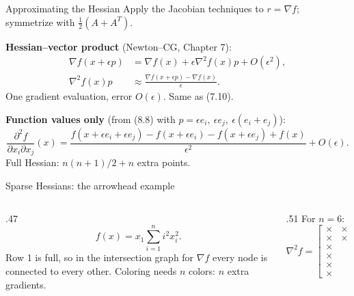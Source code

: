 \documentclass[12pt,aspectratio=169]{beamer}
\newcommand{\eps}{\epsilon}
\begin{document}
\begin{frame}{Approximating the Hessian}
  Apply the Jacobian techniques to $r=\nabla f$; symmetrize with $\tfrac12(A+A^T)$.

  \textbf{Hessian--vector product} (Newton--CG, Chapter 7):
  \begin{align}
    \nabla f(x+\eps p) &= \nabla f(x)+\eps\nabla^2 f(x)p+O(\eps^2), \tag{8.19}\\
    \nabla^2 f(x)p &\approx \frac{\nabla f(x+\eps p)-\nabla f(x)}{\eps}. \tag{8.20}
  \end{align}
  One gradient evaluation, error $O(\eps)$. Same as (7.10).

  \textbf{Function values only} (from (8.8) with $p=\eps e_i,\ \eps e_j,\ \eps(e_i+e_j)$):
  \begin{equation}
    \frac{\partial^2 f}{\partial x_i\partial x_j}(x) =
    \frac{f(x+\eps e_i+\eps e_j)-f(x+\eps e_i)-f(x+\eps e_j)+f(x)}{\eps^2}+O(\eps). \tag{8.21}
  \end{equation}
  Full Hessian: $n(n+1)/2+n$ extra points.
\end{frame}

\begin{frame}{Sparse Hessians: the arrowhead example}
  \begin{columns}[c]
    \begin{column}{.47\textwidth}
      \begin{equation}
        f(x) = x_1\sum_{i=1}^n i^2x_i^2. \tag{8.22}
      \end{equation}
      Row 1 is full, so in the intersection graph for $\nabla f$ every node is connected to every other.
      Coloring needs $n$ colors: \alert{$n$ extra gradients.}
    \end{column}
    \begin{column}{.51\textwidth}
      For $n=6$:
      \begin{equation}
        \nabla^2 f = \begin{bmatrix}
          \times&\times&\times&\times&\times&\times\\
          \times&\times&&&&\\
          \times&&\times&&&\\
          \times&&&\times&&\\
          \times&&&&\times&\\
          \times&&&&&\times
        \end{bmatrix} \tag{8.23}
      \end{equation}
    \end{column}
  \end{columns}
\end{frame}
\end{document}
